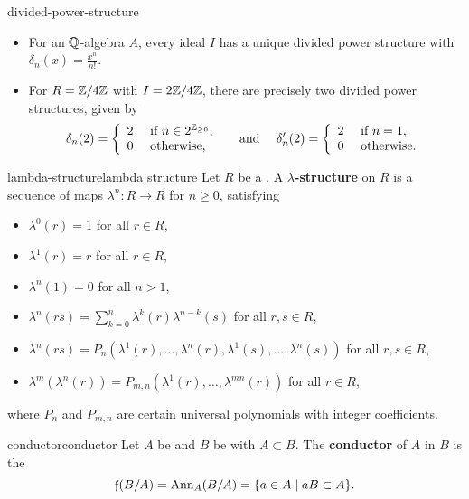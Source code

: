\begin{example}{divided-power-structure}
    \begin{itemize}
        \item For an $\mathbb{Q}$-algebra $A$, every ideal $I$ has a unique divided power structure with $\delta_n(x) = \frac{x^n}{n!}$.
        \item For $R = \mathbb{Z}/4\mathbb{Z}$ with $I = 2\mathbb{Z}/4\mathbb{Z}$, there are precisely two divided power structures, given by
        \[ \delta_n(2) = \left\{ \begin{array}{cl} 2 & \textup{ if } n \in 2^{\mathbb{Z}_{\ge 0}} , \\ 0 & \textup{ otherwise,} \end{array} \right. \quad \textup{ and } \quad \delta'_n(2) = \left\{ \begin{array}{cl} 2 & \textup{ if } n = 1 , \\ 0 & \textup{ otherwise.} \end{array} \right. \]
    \end{itemize}
\end{example}

\begin{topic}{lambda-structure}{lambda structure}
    Let $R$ be a . A \textbf{$\lambda$-structure} on $R$ is a sequence of maps $\lambda^n : R \to R$ for $n \ge 0$, satisfying
    \begin{itemize}
        \item $\lambda^0(r) = 1$ for all $r \in R$,
        \item $\lambda^1(r) = r$ for all $r \in R$,
        \item $\lambda^n(1) = 0$ for all $n > 1$,
        \item $\lambda^{n}(rs) = \sum_{k = 0}^{n} \lambda^k(r) \lambda^{n - k}(s)$ for all $r, s \in R$,
        \item $\lambda^n(rs) = P_n(\lambda^1(r), \ldots, \lambda^n(r), \lambda^1(s), \ldots,  \lambda^n(s))$ for all $r, s \in R$,
        \item $\lambda^m(\lambda^n(r)) = P_{m, n}(\lambda^1(r), \ldots, \lambda^{mn}(r))$ for all $r \in R$,
    \end{itemize}
    where $P_n$ and $P_{m, n}$ are certain universal polynomials with integer coefficients.
\end{topic}

\begin{topic}{conductor}{conductor}
    Let $A$ be and $B$ be  with $A \subset B$. The \textbf{conductor} of $A$ in $B$ is the 
    \[ \mathfrak{f}(B/A) = \textup{Ann}_A(B/A) = \{ a \in A \;|\; a B \subset A \} . \]
\end{topic}

